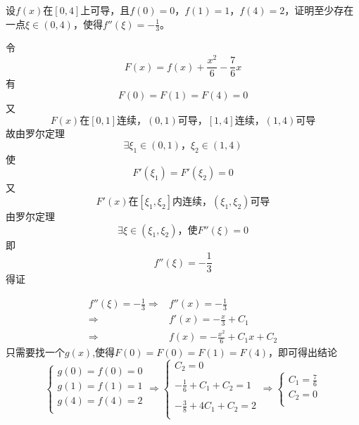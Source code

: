 \begin{example}
	设$f(x)$在$[0,4]$上可导，且$f(0)=0$，$f(1)=1$，$f(4)=2$，证明至少存在一点$\xi\in(0,4)$，使得$f''(\xi)=-\frac{1}{3}$。
\end{example}
	\begin{newproof}
		令\[F\left( x \right) =f\left( x \right) +\frac{x^2}{6}-\frac{7}{6}x\]
		有\[F\left( 0 \right) =F\left( 1 \right) =F\left( 4 \right) =0\]
		又\[F\left( x \right) \text{在}\left[ 0,1 \right] \text{连续，}\left( 0,1 \right) \text{可导，}\left[ 1,4 \right] \text{连续，}\left( 1,4 \right) \text{可导}\]
		故由罗尔定理\[\exists \xi _1\in \left( 0,1 \right) \text{，}\xi _2\in \left( 1,4 \right) \]
		使\[F'\left( \xi _1 \right) =F'\left( \xi _2 \right) =0\]
		又\[F'\left( x \right) \text{在}\left[ \xi _1,\xi _2 \right] \text{内连续，}\left( \xi _1,\xi _2 \right) \text{可导}\]
		由罗尔定理\[\exists \xi \in \left( \xi _1,\xi _2 \right) \text{，使}F''\left( \xi \right) =0\]
		即\[f''\left( \xi \right) =-\frac{1}{3}\]
		得证
	\end{newproof}
	\begin{note}
		\begin{align*}
			f''\left( \xi \right) =-\frac{1}{3}
			\Longrightarrow {}&
			f''\left( x \right) =-\frac{1}{3}\\
			\Longrightarrow {}&
			f'\left( x \right) =-\frac{x}{3}+C_1\\
			\Longrightarrow {}&
			f\left( x \right) =-\frac{x^2}{6}+C_1x+C_2
		\end{align*}
		只需要找一个$g(x)$,使得$F\left( 0 \right) =F\left( 0 \right) =F\left( 1 \right) =F\left( 4 \right) $，即可得出结论
		\[\begin{cases}
			g\left( 0 \right) =f\left( 0 \right) =0\\
			g\left( 1 \right) =f\left( 1 \right) =1\\
			g\left( 4 \right) =f\left( 4 \right) =2\\
		\end{cases}\Longrightarrow \begin{cases}
			C_2=0\\
			\\
			-\frac{1}{6}+C_1+C_2=1\\
			\\
			-\frac{3}{8}+4C_1+C_2=2\\
		\end{cases}\Longrightarrow \begin{cases}
			C_1=\frac{7}{6}\\
			C_2=0\\
		\end{cases}\]

	\end{note}

